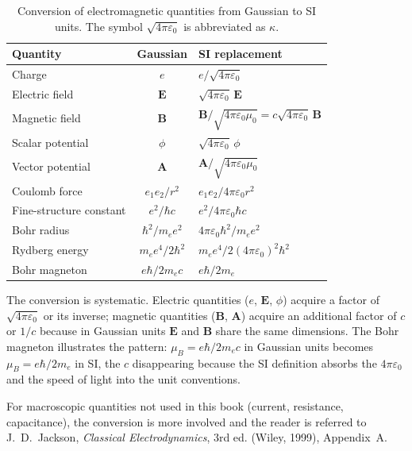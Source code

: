 \begin{table}[h]
    \centering
    \caption{Conversion of electromagnetic quantities from Gaussian to SI units. The symbol $\sqrt{4\pi\varepsilon_0}$ is abbreviated as $\kappa$.}
    \label{tab:unit-conversion}
    \renewcommand{\arraystretch}{1.4}
    \begin{tabular}{l c l}
        \hline
        Quantity & Gaussian & SI replacement \\
        \hline
        Charge & $e$ & $e/\sqrt{4\pi\varepsilon_0}$ \\
        Electric field & $\bm E$ & $\sqrt{4\pi\varepsilon_0}\,\bm E$ \\
        Magnetic field & $\bm B$ & $\bm B/\sqrt{4\pi\varepsilon_0\mu_0} = c\sqrt{4\pi\varepsilon_0}\,\bm B$ \\
        Scalar potential & $\phi$ & $\sqrt{4\pi\varepsilon_0}\,\phi$ \\
        Vector potential & $\bm A$ & $\bm A/\sqrt{4\pi\varepsilon_0\mu_0}$ \\
        Coulomb force & $e_1 e_2/r^2$ & $e_1 e_2/4\pi\varepsilon_0 r^2$ \\
        Fine-structure constant & $e^2/\hbar c$ & $e^2/4\pi\varepsilon_0\hbar c$ \\
        Bohr radius & $\hbar^2/m_e e^2$ & $4\pi\varepsilon_0\hbar^2/m_e e^2$ \\
        Rydberg energy & $m_e e^4/2\hbar^2$ & $m_e e^4/2(4\pi\varepsilon_0)^2\hbar^2$ \\
        Bohr magneton & $e\hbar/2m_e c$ & $e\hbar/2m_e$ \\
        \hline
    \end{tabular}
\end{table}

The conversion is systematic. Electric quantities ($e$, $\bm E$, $\phi$) acquire a factor of $\sqrt{4\pi\varepsilon_0}$ or its inverse; magnetic quantities ($\bm B$, $\bm A$) acquire an additional factor of $c$ or $1/c$ because in Gaussian units $\bm E$ and $\bm B$ share the same dimensions. The Bohr magneton illustrates the pattern: $\mu_B = e\hbar/2m_e c$ in Gaussian units becomes $\mu_B = e\hbar/2m_e$ in SI, the $c$ disappearing because the SI definition absorbs the $4\pi\varepsilon_0$ and the speed of light into the unit conventions.

For macroscopic quantities not used in this book (current, resistance, capacitance), the conversion is more involved and the reader is referred to J.~D.~Jackson, \emph{Classical Electrodynamics}, 3rd ed. (Wiley, 1999), Appendix~A.

